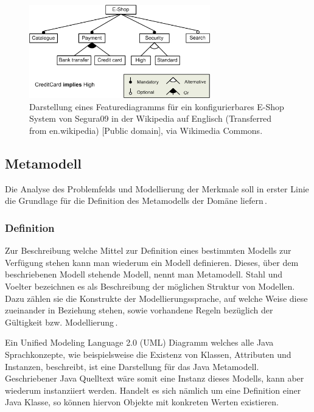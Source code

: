 \documentclass[12pt,oneside,a4paper,parskip]{scrbook}
\begin{document}
\begin{figure}[tbp]
\centering
\includegraphics[width=0.7\textwidth]{bilder/E-shopFM.jpg}
\caption{Darstellung eines Featurediagramms für ein konfigurierbares E-Shop System von Segura09 in der Wikipedia auf Englisch (Transferred from en.wikipedia) [Public domain], via Wikimedia Commons.}
\label{fig:fd}
\end{figure}

\subsection{Metamodell}

Die Analyse des Problemfelds und Modellierung der Merkmale soll in erster Linie die Grundlage für die Definition des Metamodells der Domäne liefern\,\cite[S. 200]{stahl2007}. 

\subsubsection{Definition}

Zur Beschreibung welche Mittel zur Definition eines bestimmten Modells zur Verfügung stehen kann man wiederum ein Modell definieren. Dieses, über dem beschriebenen Modell stehende Modell, nennt man Metamodell. Stahl und Voelter bezeichnen es als Beschreibung der möglichen Struktur von Modellen. Dazu zählen sie die Konstrukte der Modellierungssprache, auf welche Weise diese zueinander in Beziehung stehen, sowie vorhandene Regeln bezüglich der Gültigkeit bzw. Modellierung\,\cite[S. 59]{stahl2007}.

Ein Unified Modeling Language 2.0 (UML) Diagramm welches alle Java Sprachkonzepte, wie beispielsweise die Existenz von Klassen, Attributen und Instanzen, beschreibt, ist eine Darstellung für das Java Metamodell. Geschriebener Java Quelltext wäre somit eine Instanz dieses Modells, kann aber wiederum instanziiert werden. Handelt es sich nämlich um eine Definition einer Java Klasse, so können hiervon Objekte mit konkreten Werten existieren.
\end{document}
